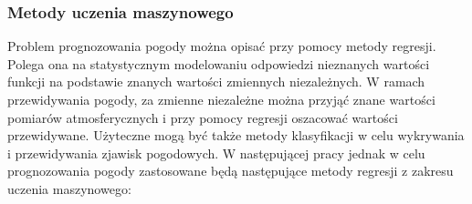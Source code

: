 \subsubsection*{Metody uczenia maszynowego}

Problem prognozowania pogody można opisać przy pomocy metody regresji. Polega ona
na statystycznym modelowaniu odpowiedzi nieznanych wartości funkcji na podstawie
znanych wartości zmiennych niezależnych. W ramach przewidywania pogody, za zmienne niezależne
można przyjąć znane wartości pomiarów atmosferycznych i przy pomocy regresji oszacować 
wartości przewidywane. Użyteczne mogą być także metody klasyfikacji w celu wykrywania i 
przewidywania zjawisk pogodowych. W następującej pracy jednak w celu prognozowania pogody
zastosowane będą następujące metody regresji z zakresu uczenia maszynowego:


